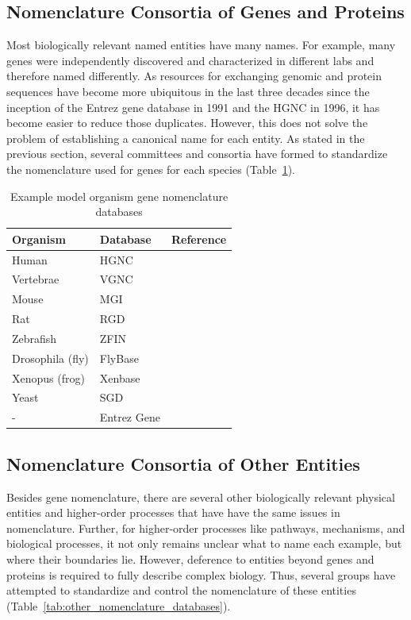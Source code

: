\subsection{Nomenclature Consortia of Genes and Proteins}

Most biologically relevant named entities have many names.
For example, many genes were independently discovered and characterized in different labs and therefore named differently.
As resources for exchanging genomic and protein sequences have become more ubiquitous in the last three decades since the inception of the Entrez gene database in 1991 and the \ac{HGNC} in 1996, it has become easier to reduce those duplicates.
However, this does not solve the problem of establishing a canonical name for each entity.
As stated in the previous section, several committees and consortia have formed to standardize the nomenclature used for genes for each species (Table~\ref{tab:gene_nomenclature_databases}).

\begin{table}
    \centering
    \caption{Example model organism gene nomenclature databases}
    \label{tab:gene_nomenclature_databases}
    \begin{tabular}{ l l l }
        Organism & Database & Reference \\
        \hline
        Human & \ac{HGNC} &\cite{Yates2017} \\
        Vertebrae & VGNC &\cite{Yates2017} \\
        Mouse & MGI &\cite{Blake2017} \\
        Rat & RGD &\cite{Shimoyama2015} \\
        Zebrafish & ZFIN &\cite{Howe2013}  \\
        Drosophila (fly) & FlyBase &\cite{Thurmond2019}\\
        Xenopus (frog) & Xenbase &\cite{Karimi2018}  \\
        Yeast & SGD &\cite{Cherry2012} \\
        - & Entrez Gene &\cite{Maglott2011}  \\
    \end{tabular}
\end{table}

\subsection{Nomenclature Consortia of Other Entities}

Besides gene nomenclature, there are several other biologically relevant physical entities and higher-order processes that have have the same issues in nomenclature.
Further, for higher-order processes like pathways, mechanisms, and biological processes, it not only remains unclear what to name each example, but where their boundaries lie.
However, deference to entities beyond genes and proteins is required to fully describe complex biology.
Thus, several groups have attempted to standardize and control the nomenclature of these entities (Table~\ref{tab:other_nomenclature_databases}).

